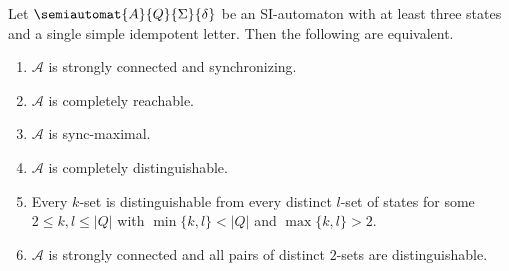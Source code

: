 \begin{corollary}\label{syncmax:SI-aut:cor:single-idempotent}
	Let $\semiautomat{A}{Q}{\Sigma}{\delta}$
	be an SI-automaton with at least three states and a single simple idempotent letter.
	Then the following are equivalent.
	\begin{enumerate}
		\item \label{syncmax:SI-aut:cor:single-idempotent:1} $\mathcal A$ is strongly connected and synchronizing. 
		
		\item \label{syncmax:SI-aut:cor:single-idempotent:2} $\mathcal A$ is completely reachable.
		
		\item \label{syncmax:SI-aut:cor:single-idempotent:3} $\mathcal A$ is sync-maximal.
		
		\item \label{syncmax:SI-aut:cor:single-idempotent:4} $\mathcal A$ is completely distinguishable.		

		\item \label{syncmax:SI-aut:cor:single-idempotent:5} Every $k$-set is distinguishable from every distinct $l$-set of states for some $2 \le k, l \le |Q|$ with $\min\{k,l\} < |Q|$ and $\max\{k, l\} > 2$.
		
		\item \label{syncmax:SI-aut:cor:single-idempotent:6} $\mathcal A$ is strongly connected and all pairs of distinct $2$-sets are distinguishable.
	\end{enumerate}
\end{corollary}
